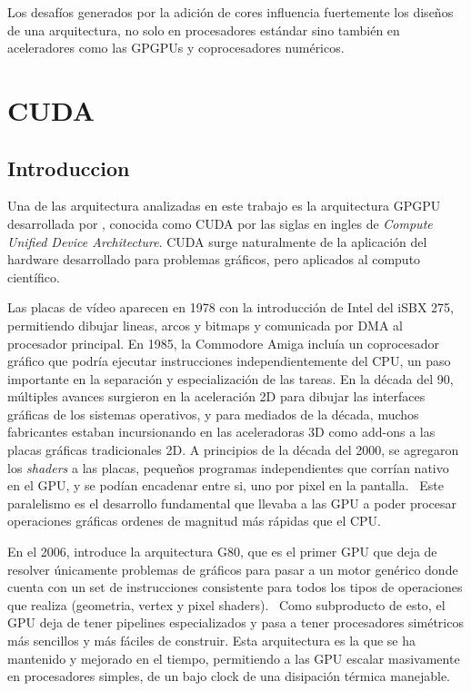 Los desaf\'ios generados por la adici\'on de cores influencia fuertemente los dise\~nos de una arquitectura, no solo en
procesadores est\'andar sino tambi\'en en aceleradores como las GPGPUs y coprocesadores num\'ericos.

\section{CUDA}

\subsection{Introduccion}

Una de las arquitectura analizadas en este trabajo es la arquitectura GPGPU desarrollada por \nvidia, conocida
como CUDA por las siglas en ingles de \textit{Compute Unified Device Architecture}.
CUDA surge naturalmente de la aplicaci\'on del hardware desarrollado para problemas gr\'aficos, pero aplicados al computo cient\'ifico.

Las placas de v\'ideo aparecen en 1978 con la introducci\'on de Intel del iSBX 275, permitiendo dibujar lineas,
arcos y bitmaps y comunicada por DMA al procesador principal. En 1985, la Commodore Amiga inclu\'ia un coprocesador
gr\'afico que podr\'ia ejecutar instrucciones independientemente del CPU, un paso importante en la separaci\'on
y especializaci\'on de las tareas. En la d\'ecada del 90, m\'ultiples
avances surgieron en la aceleraci\'on 2D para dibujar las interfaces gr\'aficas de los sistemas operativos,
y para mediados de la d\'ecada, muchos fabricantes estaban incursionando en las aceleradoras 3D como
add-ons a las placas gr\'aficas tradicionales 2D. A principios de la d\'ecada del 2000, se agregaron los
\textit{shaders} a las placas, peque\~nos programas independientes que corr\'ian nativo en el GPU,
y se pod\'ian encadenar entre si, uno por pixel en la pantalla.~\cite{CG} Este paralelismo es el desarrollo fundamental
que llevaba a las GPU a poder procesar operaciones gr\'aficas ordenes de magnitud m\'as r\'apidas que el CPU.

En el 2006, \nvidia  introduce la arquitectura G80,
que es el primer GPU que deja de resolver \'unicamente problemas de gr\'aficos
para pasar a un motor gen\'erico donde cuenta con un set de instrucciones consistente para todos los
tipos de operaciones que realiza (geometria, vertex y pixel shaders).~\cite{cudaHandbook} Como subproducto de esto,
el GPU deja de tener pipelines especializados y pasa a tener procesadores sim\'etricos m\'as sencillos y m\'as
f\'aciles de construir. Esta arquitectura es la que se ha mantenido y mejorado en el tiempo, permitiendo
a las GPU escalar masivamente en procesadores simples, de un bajo clock de una disipaci\'on t\'ermica
manejable.


